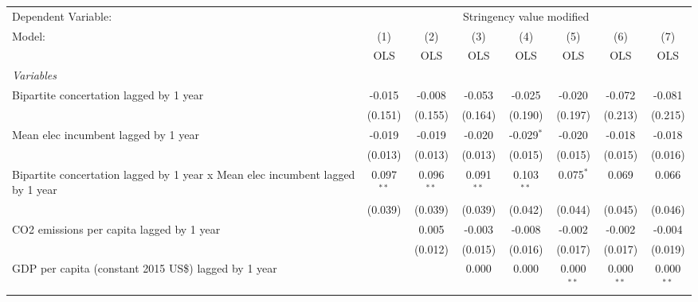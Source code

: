 
\begingroup
\centering
\begin{tabular}{lccccccc}
   \toprule
   Dependent Variable: & \multicolumn{7}{c}{Stringency value modified}\\
   Model:                                                                         & (1)          & (2)          & (3)          & (4)          & (5)          & (6)          & (7)\\  
                                                                                  &  OLS         & OLS          & OLS          & OLS          & OLS          & OLS          & OLS\\  
   \midrule
   \emph{Variables}\\
   Bipartite concertation lagged by 1 year                                        & -0.015       & -0.008       & -0.053       & -0.025       & -0.020       & -0.072       & -0.081\\   
                                                                                  & (0.151)      & (0.155)      & (0.164)      & (0.190)      & (0.197)      & (0.213)      & (0.215)\\   
   Mean elec incumbent lagged by 1 year                                           & -0.019       & -0.019       & -0.020       & -0.029$^{*}$ & -0.020       & -0.018       & -0.018\\   
                                                                                  & (0.013)      & (0.013)      & (0.013)      & (0.015)      & (0.015)      & (0.015)      & (0.016)\\   
   Bipartite concertation lagged by 1 year x Mean elec incumbent lagged by 1 year & 0.097$^{**}$ & 0.096$^{**}$ & 0.091$^{**}$ & 0.103$^{**}$ & 0.075$^{*}$  & 0.069        & 0.066\\   
                                                                                  & (0.039)      & (0.039)      & (0.039)      & (0.042)      & (0.044)      & (0.045)      & (0.046)\\   
   CO2 emissions per capita lagged by 1 year                                      &              & 0.005        & -0.003       & -0.008       & -0.002       & -0.002       & -0.004\\   
                                                                                  &              & (0.012)      & (0.015)      & (0.016)      & (0.017)      & (0.017)      & (0.019)\\   
   GDP per capita (constant 2015 US\$) lagged by 1 year                           &              &              & 0.000        & 0.000        & 0.000$^{**}$ & 0.000$^{**}$ & 0.000$^{**}$\\   

\end{tabular}
